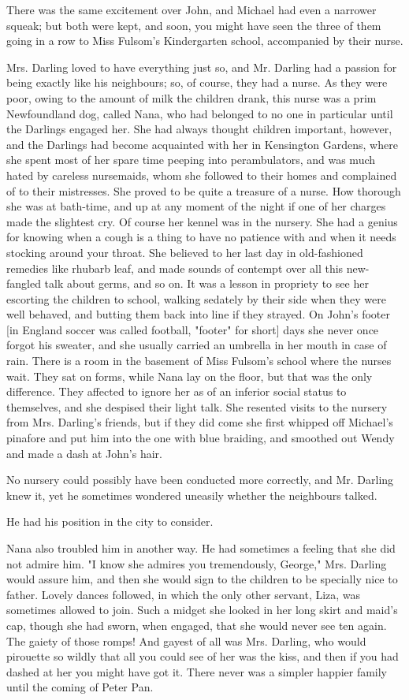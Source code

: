 There was the same excitement over John, and Michael had even a narrower
squeak; but both were kept, and soon, you might have seen the three of
them going in a row to Miss Fulsom's Kindergarten school, accompanied by
their nurse.


Mrs. Darling loved to have everything just so, and Mr. Darling had a
passion for being exactly like his neighbours; so, of course, they had a
nurse. As they were poor, owing to the amount of milk the children drank,
this nurse was a prim Newfoundland dog, called Nana, who had belonged to
no one in particular until the Darlings engaged her. She had always
thought children important, however, and the Darlings had become
acquainted with her in Kensington Gardens, where she spent most of her
spare time peeping into perambulators, and was much hated by careless
nursemaids, whom she followed to their homes and complained of to their
mistresses. She proved to be quite a treasure of a nurse. How thorough she
was at bath-time, and up at any moment of the night if one of her charges
made the slightest cry. Of course her kennel was in the nursery. She had a
genius for knowing when a cough is a thing to have no patience with and
when it needs stocking around your throat. She believed to her last day in
old-fashioned remedies like rhubarb leaf, and made sounds of contempt over
all this new-fangled talk about germs, and so on. It was a lesson in
propriety to see her escorting the children to school, walking sedately by
their side when they were well behaved, and butting them back into line if
they strayed. On John's footer [in England soccer was called football,
"footer" for short] days she never once forgot his sweater, and she
usually carried an umbrella in her mouth in case of rain. There is a room
in the basement of Miss Fulsom's school where the nurses wait. They sat on
forms, while Nana lay on the floor, but that was the only difference. They
affected to ignore her as of an inferior social status to themselves, and
she despised their light talk. She resented visits to the nursery from
Mrs. Darling's friends, but if they did come she first whipped off
Michael's pinafore and put him into the one with blue braiding, and
smoothed out Wendy and made a dash at John's hair.


No nursery could possibly have been conducted more correctly, and Mr.
Darling knew it, yet he sometimes wondered uneasily whether the neighbours
talked.


He had his position in the city to consider.


Nana also troubled him in another way. He had sometimes a feeling that she
did not admire him. "I know she admires you tremendously, George," Mrs.
Darling would assure him, and then she would sign to the children to be
specially nice to father. Lovely dances followed, in which the only other
servant, Liza, was sometimes allowed to join. Such a midget she looked in
her long skirt and maid's cap, though she had sworn, when engaged, that
she would never see ten again. The gaiety of those romps! And gayest of
all was Mrs. Darling, who would pirouette so wildly that all you could see
of her was the kiss, and then if you had dashed at her you might have got
it. There never was a simpler happier family until the coming of Peter
Pan.


